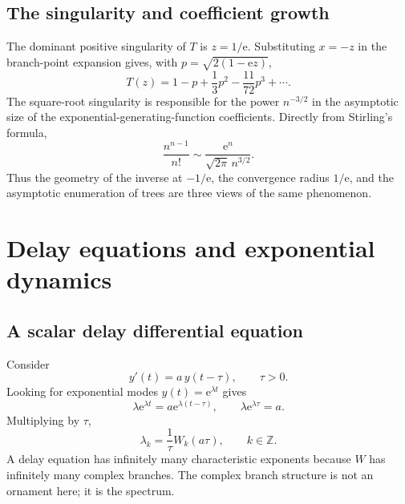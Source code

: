 \documentclass[11pt,openany]{book}
\newcommand{\e}{\mathrm{e}}
\theoremstyle{plain}
\theoremstyle{definition}
\theoremstyle{remark}
\begin{document}
\section{The singularity and coefficient growth}
The dominant positive singularity of \(T\) is \(z=1/\e\).  Substituting
\(x=-z\) in the branch-point expansion gives, with
\(p=\sqrt{2(1-\e z)}\),
\begin{equation}\label{eq:Tsingular}
 T(z)=1-p+\frac13p^2-\frac{11}{72}p^3+\cdots.
\end{equation}
The square-root singularity is responsible for the power \(n^{-3/2}\) in the
asymptotic size of the exponential-generating-function coefficients.  Directly
from Stirling's formula,
\begin{equation}\label{eq:treeasymp}
       \frac{n^{n-1}}{n!}
       \sim\frac{\e^n}{\sqrt{2\pi}\,n^{3/2}}.
\end{equation}
Thus the geometry of the inverse at \(-1/\e\), the convergence radius
\(1/\e\), and the asymptotic enumeration of trees are three views of the same
phenomenon.

\chapter{Delay equations and exponential dynamics}\label{chap:delays}

\section{A scalar delay differential equation}
Consider
\begin{equation}\label{eq:simpleDDE}
             y'(t)=a\,y(t-\tau),
             \qquad \tau>0.
\end{equation}
Looking for exponential modes \(y(t)=\e^{\lambda t}\) gives
\[
       \lambda\e^{\lambda t}
       =a\e^{\lambda(t-\tau)},
       \qquad
       \lambda\e^{\lambda\tau}=a.
\]
Multiplying by \(\tau\),
\begin{equation}\label{eq:DDEspectrum}
       \lambda_k=\frac1\tau W_k(a\tau),
       \qquad k\in\mathbb Z.
\end{equation}
A delay equation has infinitely many characteristic exponents because \(W\)
has infinitely many complex branches.  The complex branch structure is not an
ornament here; it is the spectrum.
\end{document}
